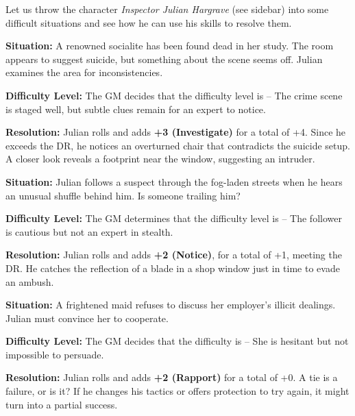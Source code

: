 Let us throw the character \emph{Inspector Julian Hargrave} (see sidebar) into some difficult situations and see how he can use his skills to resolve them.

\begin{WyrdExample}
	\textbf{Situation:} A renowned socialite has been found dead in her study. The room appears to suggest suicide, but something about the scene seems off. Julian examines the area for inconsistencies.

	\noindent
	\textbf{Difficulty Level:} The GM decides that the difficulty level is \Formidable – The crime scene is staged well, but subtle clues remain for an expert to notice.

	\noindent
	\textbf{Resolution:} Julian rolls  and adds \textbf{+3 (Investigate)} for a total of +4. Since he exceeds the DR, he notices an overturned chair that contradicts the suicide setup. A closer look reveals a footprint near the window, suggesting an intruder.
\end{WyrdExample}


\begin{WyrdExample}
	\textbf{Situation:} Julian follows a suspect through the fog-laden streets when he hears an unusual shuffle behind him. Is someone trailing him?

	\noindent\textbf{Difficulty Level:} The GM determines that the difficulty level is \Difficult – The follower is cautious but not an expert in stealth.

	\noindent\textbf{Resolution:} Julian rolls  and adds  \textbf{+2 (Notice)}, for a total of +1, meeting the DR. He catches the reflection of a blade in a shop window just in time to evade an ambush.
\end{WyrdExample}


\begin{WyrdExample}
	\textbf{Situation:} A frightened maid refuses to discuss her employer’s illicit dealings. Julian must convince her to cooperate.

	\noindent\textbf{Difficulty Level:} The GM decides that the difficulty is \Challenging – She is hesitant but not impossible to persuade.

	\noindent\textbf{Resolution:} Julian rolls \FudgeRes{+---} and adds \textbf{+2 (Rapport)} for a total of +0. A tie is a failure, or is it? If he changes his tactics or offers protection to try again, it might turn into a partial success.
\end{WyrdExample}


